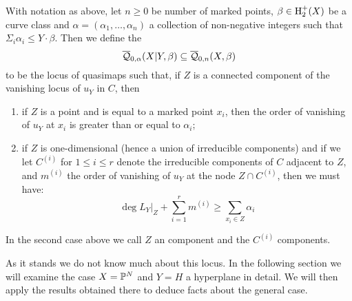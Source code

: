 \begin{definition} With notation as above, let $n \geq 0$ be number of marked points, $\beta \in \operatorname{H}_2^+(X)$ be a curve class and $\alpha=(\alpha_1, \ldots, \alpha_n)$ a collection of non-negative integers such that $\Sigma_i \alpha_i \leq Y \cdot \beta$. Then we define the 
\begin{equation*} \overline{\mathcal Q}_{0,\alpha}(X|Y,\beta) \subseteq \overline{\mathcal Q}_{0,n}(X,\beta) \end{equation*}
to be the locus of quasimaps such that, if $Z$ is a connected component of the vanishing locus of $u_Y$ in $C$, then
\begin{enumerate}
\item if $Z$ is a point and is equal to a marked point $x_i$, then the order of vanishing of $u_Y$ at $x_i$ is greater than or equal to $\alpha_i$;
\item if $Z$ is one-dimensional (hence a union of irreducible components) and if we let $C^{(i)}$ for $1 \leq i \leq r$ denote the irreducible components of $C$ adjacent to $Z$, and $m^{(i)}$ the order of vanishing of $u_Y$ at the node $Z \cap C^{(i)}$, then we must have:
\begin{equation} \label{Relative quasimap internal component inequality} \deg L_Y|_Z + \sum_{i=1}^r m^{(i)} \geq \sum_{x_i \in Z} \alpha_i \end{equation}
\end{enumerate}
\end{definition}

\begin{remark}In the second case above we call $Z$ an  component and the $C^{(i)}$  components.\end{remark}

As it stands we do not know much about this locus. In the following section we will examine the case $X=\mathbb P^N$ and $Y=H$ a hyperplane in detail. We will then apply the results obtained there to deduce facts about the general case.